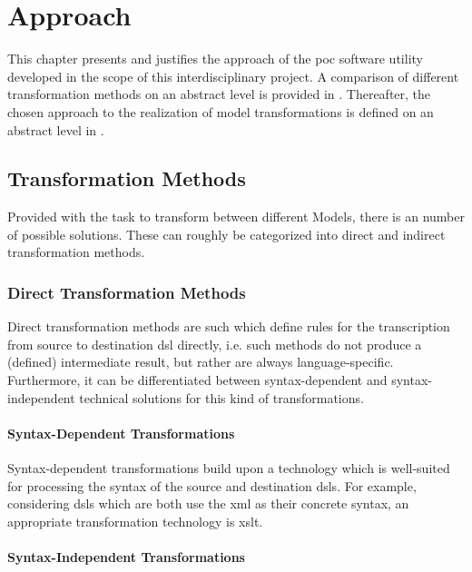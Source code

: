 \chapter{Approach}
\label{chap:approach}

This chapter presents and justifies the approach of the \gls{poc} software utility developed in the scope of this interdisciplinary project. A comparison of different transformation methods on an abstract level is provided in . Thereafter, the chosen approach to the realization of model transformations is defined on an abstract level in .

\section{Transformation Methods}
\label{sec:approach:transform}

Provided with the task to transform between different Models, there is an number of possible solutions. These can roughly be categorized into direct and indirect transformation methods.

\subsection{Direct Transformation Methods}

Direct transformation methods are such which define rules for the transcription from source to destination \gls{dsl} directly, i.e. such methods do not produce a (defined) intermediate result, but rather are always language-specific. Furthermore, it can be differentiated between syntax-dependent and syntax-independent technical solutions for this kind of transformations.

\subsubsection{Syntax-Dependent Transformations}

Syntax-dependent transformations build upon a technology which is well-suited for processing the syntax of the source and destination \glspl{dsl}. For example, considering \glspl{dsl} which are both use the \gls{xml} as their concrete syntax, an appropriate transformation technology is \gls{xslt}.

\subsubsection{Syntax-Independent Transformations}

